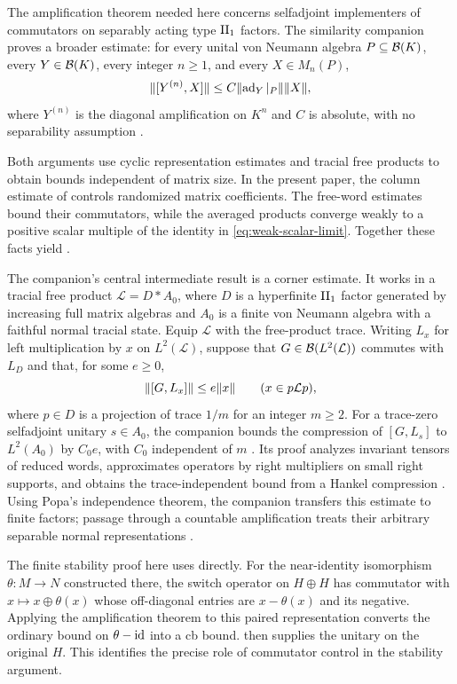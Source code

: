The amplification theorem needed here concerns selfadjoint implementers
of commutators on separably acting type $\mathrm{II}_1$ factors. The similarity
companion proves a broader estimate: for every unital von Neumann algebra
$P\subseteq\mathcal B(K)$, every $Y\in\mathcal B(K)$, every integer $n\ge1$, and every
$X\in M_n(P)$,
\[
 \lVert[Y^{(n)},X]\rVert
 \le C\lVert\operatorname{ad}_Y|_P\rVert\lVert X\rVert,
\]
where $Y^{(n)}$ is the diagonal amplification on $K^n$ and $C$ is
absolute, with no separability assumption
\cite[Theorem~1.2]{OpenAI2026Similarity}.

Both arguments use cyclic representation estimates and tracial free
products to obtain bounds independent of matrix size. In the present
paper, the column estimate of  controls
randomized matrix coefficients. The free-word estimates bound their
commutators, while the averaged products converge weakly to a positive
scalar multiple of the identity in \eqref{eq:weak-scalar-limit}.
Together these facts yield .

The companion's central intermediate result is a corner estimate.
It works in a tracial free product $\mathcal L=D*A_0$, where $D$ is a
hyperfinite $\mathrm{II}_1$ factor generated by increasing full matrix algebras
and $A_0$ is a finite von Neumann algebra with a faithful normal tracial
state. Equip $\mathcal L$ with the free-product trace.
Writing $L_x$ for left multiplication by $x$ on $L^2(\mathcal L)$,
suppose that $G\in\mathcal B(L^2(\mathcal L))$ commutes with $L_D$ and that,
for some $e\ge0$,
\[
 \lVert[G,L_x]\rVert\le e\lVert x\rVert\qquad(x\in p\mathcal Lp),
\]
where $p\in D$ is a projection of trace $1/m$ for an integer $m\ge2$. For a
trace-zero selfadjoint unitary $s\in A_0$, the companion bounds the
compression of $[G,L_s]$ to $L^2(A_0)$ by $C_0e$, with $C_0$
independent of $m$ \cite[Theorem~3.1]{OpenAI2026Similarity}.
Its proof analyzes invariant tensors of reduced words, approximates
operators by right multipliers on small right supports, and obtains the
trace-independent bound from a Hankel compression
\cite[Sections~3--5]{OpenAI2026Similarity}. Using Popa's independence theorem,
the companion transfers this estimate to finite factors; passage through a
countable amplification treats their arbitrary separable normal
representations \cite[Section~6 and Proposition~7.1]{OpenAI2026Similarity}.

The finite stability proof here uses  directly.
For the near-identity isomorphism $\theta:M\to N$ constructed there,
the switch operator on $H\oplus H$ has commutator with
$x\mapsto x\oplus\theta(x)$ whose off-diagonal entries are
$x-\theta(x)$ and its negative. Applying the amplification theorem to
this paired representation converts the ordinary bound on $\theta-\operatorname{id}$ into a
cb bound.  then supplies the unitary on the original
$H$. This identifies the precise role of commutator control in the
stability argument.

